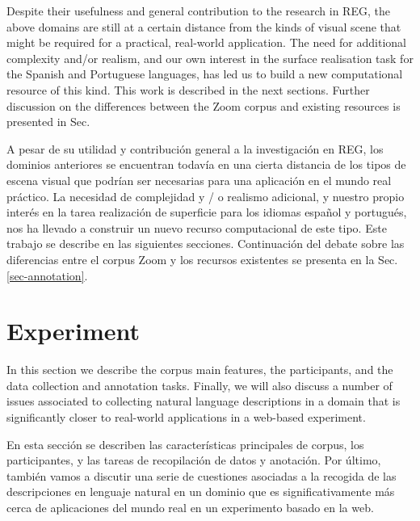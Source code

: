 Despite their usefulness and general contribution to the research in REG, the above domains are still at a certain distance from the kinds of visual scene that might be required for a practical, real-world application. The need for additional complexity and/or realism, and our own interest in the surface realisation task for the Spanish and Portuguese languages, has led us to build a new computational resource of this kind. This work is described in the next sections. Further discussion on the differences between the Zoom corpus and existing resources is presented in Sec. 


A pesar de su utilidad y contribuci\'on general a la investigaci\'on en REG, los dominios anteriores se encuentran todav\'{i}a en una cierta distancia de los tipos de escena visual que podr\'{i}an ser necesarias para una aplicaci\'on en el mundo real pr\'actico. La necesidad de complejidad y / o realismo adicional, y nuestro propio inter\'es en la tarea realizaci\'on de superficie para los idiomas espa\~nol y portugu\'es, nos ha llevado a construir un nuevo recurso computacional de este tipo. Este trabajo se describe en las siguientes secciones. Continuaci\'on del debate sobre las diferencias entre el corpus Zoom y los recursos existentes se presenta en la Sec.\ref{sec-annotation}. 


\section{Experiment}
\label{sec-experiment}

In this section we describe the corpus main features, the participants, and the data collection and annotation tasks. Finally, we will also discuss a number of issues associated to collecting natural language descriptions in a domain that is significantly closer to real-world applications in a web-based experiment.   


En esta secci\'on se describen las caracter\'{i}sticas principales de corpus, los participantes, y las tareas de recopilaci\'on de datos y anotaci\'on. Por \'ultimo, tambi\'en vamos a discutir una serie de cuestiones asociadas a la recogida de las descripciones en lenguaje natural en un dominio que es significativamente m\'as cerca de aplicaciones del mundo real en un experimento basado en la web.
